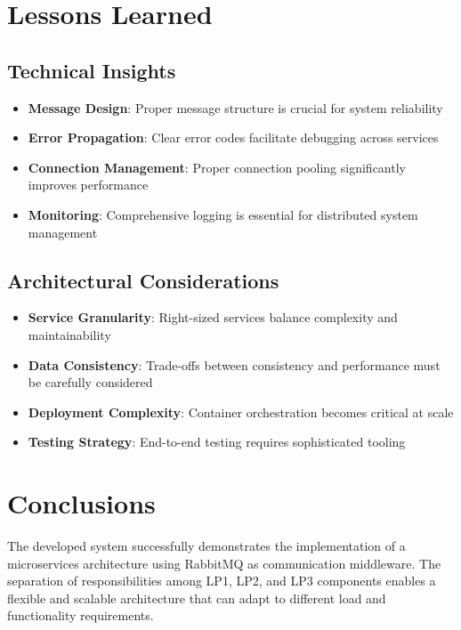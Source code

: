 \documentclass[10pt,a4paper]{article}
\theoremstyle{definition}
\theoremstyle{remark}
\begin{document}
\section{Lessons Learned}

\subsection{Technical Insights}
\begin{itemize}
    \item \textbf{Message Design}: Proper message structure is crucial for system reliability
    \item \textbf{Error Propagation}: Clear error codes facilitate debugging across services
    \item \textbf{Connection Management}: Proper connection pooling significantly improves performance
    \item \textbf{Monitoring}: Comprehensive logging is essential for distributed system management
\end{itemize}

\subsection{Architectural Considerations}
\begin{itemize}
    \item \textbf{Service Granularity}: Right-sized services balance complexity and maintainability
    \item \textbf{Data Consistency}: Trade-offs between consistency and performance must be carefully considered
    \item \textbf{Deployment Complexity}: Container orchestration becomes critical at scale
    \item \textbf{Testing Strategy}: End-to-end testing requires sophisticated tooling
\end{itemize}

\section{Conclusions}

The developed system successfully demonstrates the implementation of a microservices architecture using RabbitMQ as communication middleware. The separation of responsibilities among LP1, LP2, and LP3 components enables a flexible and scalable architecture that can adapt to different load and functionality requirements.
\end{document}
